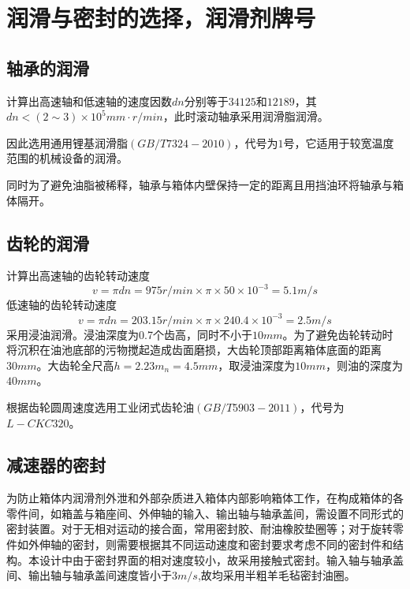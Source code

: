 \section{润滑与密封的选择，润滑剂牌号}
\subsection{轴承的润滑}
计算出高速轴和低速轴的速度因数$dn$分别等于$34125$和$12189$，其$dn<(2\sim 3)\times10^5mm\cdot r/min$，此时滚动轴承采用润滑脂润滑。

因此选用通用锂基润滑脂$(GB/T7324-2010)$，代号为$1$号，它适用于较宽温度范围的机械设备的润滑。

同时为了避免油脂被稀释，轴承与箱体内壁保持一定的距离且用挡油环将轴承与箱体隔开。
\subsection{齿轮的润滑}
计算出高速轴的齿轮转动速度
\[
    v= \pi dn=975r/min\times \pi \times 50\times 10^{-3} =5.1m/s
\]
低速轴的齿轮转动速度
\[
    v= \pi dn=203.15r/min\times \pi \times 240.4\times 10^{-3}=2.5m/s
\]
采用浸油润滑。浸油深度为0.7个齿高，同时不小于$10mm$。为了避免齿轮转动时将沉积在油池底部的污物搅起造成齿面磨损，大齿轮顶部距离箱体底面的距离$30mm$。大齿轮全尺高$h=2.23m_n=4.5mm$，取浸油深度为$10mm$，则油的深度为$40mm$。

根据齿轮圆周速度选用工业闭式齿轮油$(GB/T5903-2011)$，代号为$L-CKC320$。
\subsection{减速器的密封}
为防止箱体内润滑剂外泄和外部杂质进入箱体内部影响箱体工作，在构成箱体的各零件间，如箱盖与箱座间、外伸轴的输入、输出轴与轴承盖间，需设置不同形式的密封装置。对于无相对运动的接合面，常用密封胶、耐油橡胶垫圈等；对于旋转零件如外伸轴的密封，则需要根据其不同运动速度和密封要求考虑不同的密封件和结构。本设计中由于密封界面的相对速度较小，故采用接触式密封。输入轴与轴承盖间、输出轴与轴承盖间速度皆小于$3m/s$,故均采用半粗羊毛毡密封油圈。